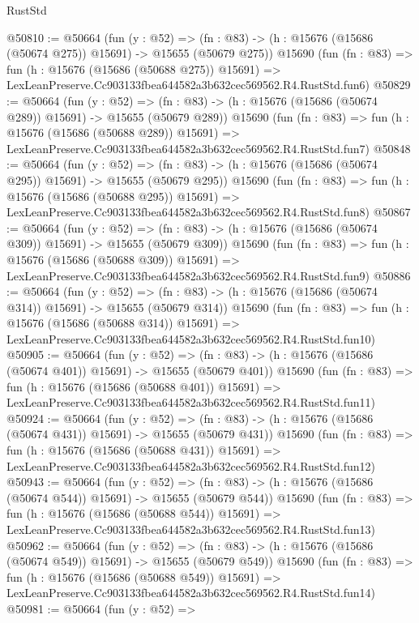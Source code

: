 \begin{lexlean}{RustStd}
\begin{coremodule}
@50810 := @50664
    (fun (y : @52) =>
    (fn : @83) -> (h : @15676 (@15686 (@50674 @275)) @15691) -> @15655 (@50679 @275))
    @15690
    (fun (fn : @83) =>
    fun (h : @15676 (@15686 (@50688 @275)) @15691) =>
    LexLeanPreserve.Cc903133fbea644582a3b632cec569562.R4.RustStd.fun6)
@50829 := @50664
    (fun (y : @52) =>
    (fn : @83) -> (h : @15676 (@15686 (@50674 @289)) @15691) -> @15655 (@50679 @289))
    @15690
    (fun (fn : @83) =>
    fun (h : @15676 (@15686 (@50688 @289)) @15691) =>
    LexLeanPreserve.Cc903133fbea644582a3b632cec569562.R4.RustStd.fun7)
@50848 := @50664
    (fun (y : @52) =>
    (fn : @83) -> (h : @15676 (@15686 (@50674 @295)) @15691) -> @15655 (@50679 @295))
    @15690
    (fun (fn : @83) =>
    fun (h : @15676 (@15686 (@50688 @295)) @15691) =>
    LexLeanPreserve.Cc903133fbea644582a3b632cec569562.R4.RustStd.fun8)
@50867 := @50664
    (fun (y : @52) =>
    (fn : @83) -> (h : @15676 (@15686 (@50674 @309)) @15691) -> @15655 (@50679 @309))
    @15690
    (fun (fn : @83) =>
    fun (h : @15676 (@15686 (@50688 @309)) @15691) =>
    LexLeanPreserve.Cc903133fbea644582a3b632cec569562.R4.RustStd.fun9)
@50886 := @50664
    (fun (y : @52) =>
    (fn : @83) -> (h : @15676 (@15686 (@50674 @314)) @15691) -> @15655 (@50679 @314))
    @15690
    (fun (fn : @83) =>
    fun (h : @15676 (@15686 (@50688 @314)) @15691) =>
    LexLeanPreserve.Cc903133fbea644582a3b632cec569562.R4.RustStd.fun10)
@50905 := @50664
    (fun (y : @52) =>
    (fn : @83) -> (h : @15676 (@15686 (@50674 @401)) @15691) -> @15655 (@50679 @401))
    @15690
    (fun (fn : @83) =>
    fun (h : @15676 (@15686 (@50688 @401)) @15691) =>
    LexLeanPreserve.Cc903133fbea644582a3b632cec569562.R4.RustStd.fun11)
@50924 := @50664
    (fun (y : @52) =>
    (fn : @83) -> (h : @15676 (@15686 (@50674 @431)) @15691) -> @15655 (@50679 @431))
    @15690
    (fun (fn : @83) =>
    fun (h : @15676 (@15686 (@50688 @431)) @15691) =>
    LexLeanPreserve.Cc903133fbea644582a3b632cec569562.R4.RustStd.fun12)
@50943 := @50664
    (fun (y : @52) =>
    (fn : @83) -> (h : @15676 (@15686 (@50674 @544)) @15691) -> @15655 (@50679 @544))
    @15690
    (fun (fn : @83) =>
    fun (h : @15676 (@15686 (@50688 @544)) @15691) =>
    LexLeanPreserve.Cc903133fbea644582a3b632cec569562.R4.RustStd.fun13)
@50962 := @50664
    (fun (y : @52) =>
    (fn : @83) -> (h : @15676 (@15686 (@50674 @549)) @15691) -> @15655 (@50679 @549))
    @15690
    (fun (fn : @83) =>
    fun (h : @15676 (@15686 (@50688 @549)) @15691) =>
    LexLeanPreserve.Cc903133fbea644582a3b632cec569562.R4.RustStd.fun14)
@50981 := @50664
    (fun (y : @52) =>

\end{coremodule}
\end{lexlean}
